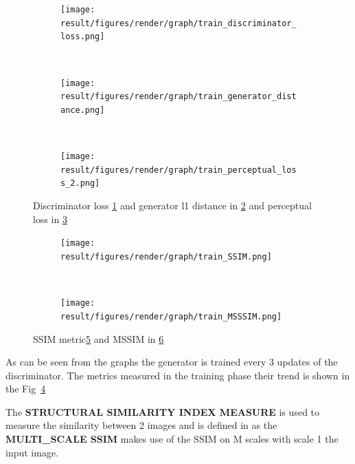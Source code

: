 \begin{figure}[!h]
    \centering
    \begin{subfigure}[b]{0.3\textwidth}
        \texttt{[image: result/figures/render/graph/train\_discriminator\_loss.png]}
        \caption{}
        \label{subfig:render_discriminator_loss}
    \end{subfigure}
    ~
    \begin{subfigure}[b]{0.3\textwidth}
        \texttt{[image: result/figures/render/graph/train\_generator\_distance.png]}
        \caption{}
        \label{subfig:render_generator_l1}
    \end{subfigure}
    ~
    \begin{subfigure}[b]{0.3\textwidth}
        \texttt{[image: result/figures/render/graph/train\_perceptual\_loss\_2.png]}
        \caption{}
        \label{subfig:render_generator_perceptual}
    \end{subfigure}
    \caption{Discriminator loss \ref{subfig:render_discriminator_loss} and generator l1 distance in \ref{subfig:render_generator_l1} and perceptual loss in \ref{subfig:render_generator_perceptual}}
    \label{fig:render_loss_training_graph_best}
\end{figure}

\begin{figure}[!h]
    \centering
    \begin{subfigure}[b]{0.3\textwidth}
        \texttt{[image: result/figures/render/graph/train\_SSIM.png]}
        \caption{}
        \label{subfig:render_ssim_metric}
    \end{subfigure}
    ~
    \begin{subfigure}[b]{0.3\textwidth}
        \texttt{[image: result/figures/render/graph/train\_MSSSIM.png]}
        \caption{}
        \label{subfig:render_msssim_metric}
    \end{subfigure}
    \caption{SSIM metric\ref{subfig:render_ssim_metric} and MSSIM in \ref{subfig:render_msssim_metric}}
    \label{fig:render_metrics_training_graph_best}
\end{figure}

As can be seen from the graphs the generator is trained every 3 updates of the discriminator.
The metrics measured in the training phase their trend is shown in the Fig~\ref{fig:render_loss_training_graph_best}

The \textbf{STRUCTURAL SIMILARITY INDEX MEASURE} is used to measure the similarity between 2 images and is defined in \cite{wang2003multiscale} as the \textbf{MULTI_SCALE SSIM} makes use of the SSIM on M scales with scale 1 the input image.

